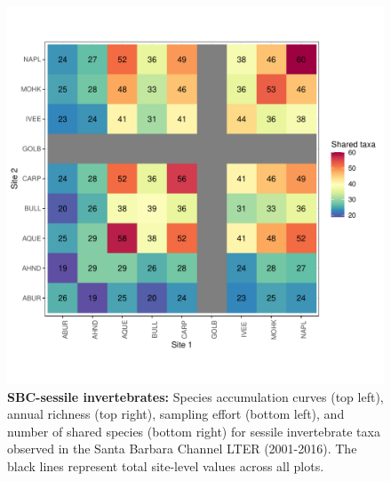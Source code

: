 \documentclass[11pt, oneside]{article}
\begin{document}
\begin{figure}[h!]
\includegraphics[scale = 0.4]{sbc-sessileInverts-castorani_spp_shared.pdf}
\caption{{\bf SBC-sessile invertebrates:} Species accumulation curves (top left),  annual richness (top right), sampling effort (bottom left), and number of shared species (bottom right)  for sessile invertebrate taxa observed in the Santa Barbara Channel LTER (2001-2016). The black lines represent total site-level values across all plots.}
\label{sbc-sessileInverts}
\end{figure}
\end{document}
